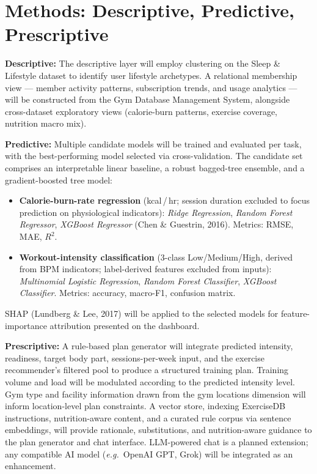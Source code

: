 \documentclass[11pt,a4paper]{article}
\begin{document}
\section{Methods: Descriptive, Predictive, Prescriptive}
\textbf{Descriptive:} The descriptive layer will employ clustering on the Sleep \& Lifestyle dataset to identify user lifestyle archetypes. A relational membership view --- member activity patterns, subscription trends, and usage analytics --- will be constructed from the Gym Database Management System, alongside cross-dataset exploratory views (calorie-burn patterns, exercise coverage, nutrition macro mix).

\textbf{Predictive:} Multiple candidate models will be trained and evaluated per task, with the best-performing model selected via cross-validation. The candidate set comprises an interpretable linear baseline, a robust bagged-tree ensemble, and a gradient-boosted tree model:
\begin{itemize}
  \item \textbf{Calorie-burn-rate regression} (kcal\,/\,hr; session duration excluded to focus prediction on physiological indicators): \emph{Ridge Regression}, \emph{Random Forest Regressor}, \emph{XGBoost Regressor} (Chen \& Guestrin, 2016). Metrics: RMSE, MAE, $R^2$.
  \item \textbf{Workout-intensity classification} (3-class Low/Medium/High, derived from BPM indicators; label-derived features excluded from inputs): \emph{Multinomial Logistic Regression}, \emph{Random Forest Classifier}, \emph{XGBoost Classifier}. Metrics: accuracy, macro-F1, confusion matrix.
\end{itemize}
SHAP (Lundberg \& Lee, 2017) will be applied to the selected models for feature-importance attribution presented on the dashboard.

\textbf{Prescriptive:} A rule-based plan generator will integrate predicted intensity, readiness, target body part, sessions-per-week input, and the exercise recommender's filtered pool to produce a structured training plan. Training volume and load will be modulated according to the predicted intensity level. Gym type and facility information drawn from the gym locations dimension will inform location-level plan constraints. A vector store, indexing ExerciseDB instructions, nutrition-aware content, and a curated rule corpus via sentence embeddings, will provide rationale, substitutions, and nutrition-aware guidance to the plan generator and chat interface. LLM-powered chat is a planned extension; any compatible AI model (\emph{e.g.}\ OpenAI GPT, Grok) will be integrated as an enhancement.
\end{document}
